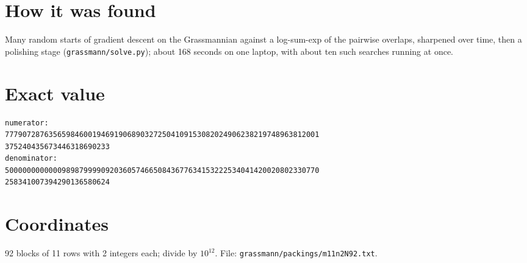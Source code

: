 \documentclass[11pt,a4paper]{article}
\begin{document}
\section{How it was found}
Many random starts of gradient descent on the Grassmannian against a log-sum-exp of the pairwise overlaps, sharpened over time, then a polishing stage (\texttt{grassmann/solve.py}); about 168 seconds on one laptop, with about ten such searches running at once.


\appendix
\section{Exact value}
{\small
\begin{verbatim}
numerator:
777907287635659846001946919068903272504109153082024906238219748963812001
375240435673446318690233
denominator:
500000000000098987999909203605746650843677634153222534041420020802330770
258341007394290136580624
\end{verbatim}}

\section{Coordinates}
92 blocks of 11 rows with 2 integers each; divide by $10^{12}$. File: \texttt{grassmann/packings/m11n2N92.txt}.
{\tiny
\begin{multicols}{4}
\end{multicols}}
\end{document}
